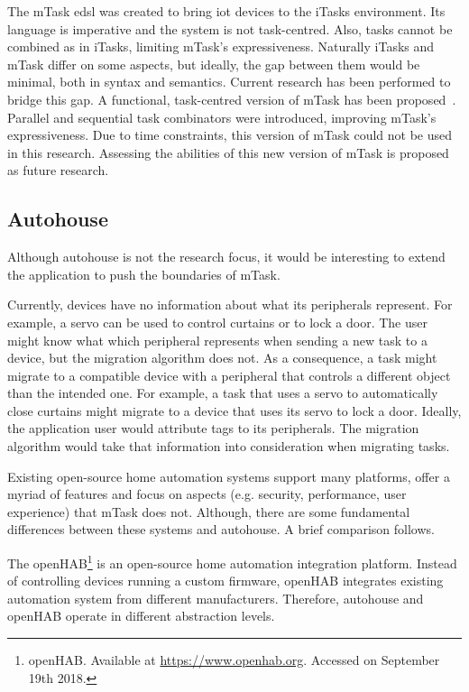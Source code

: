 The \gls{mTask} \acs{edsl} was created to bring \acs{iot} devices to the \gls{iTasks} environment. Its language is imperative and the system is not task-centred. Also, tasks cannot be combined as in \gls{iTasks}, limiting \gls{mTask}'s expressiveness. Naturally \gls{iTasks} and \gls{mTask} differ on some aspects, but ideally, the gap between them would be minimal, both in syntax and semantics. Current research has been performed to bridge this gap. A functional, task-centred version of \gls{mTask} has been proposed~\cite{micro}. Parallel and sequential task combinators were introduced, improving \gls{mTask}'s expressiveness. Due to time constraints, this version of \gls{mTask} could not be used in this research. Assessing the abilities of this new version of \gls{mTask} is proposed as future research.

\subsection{Autohouse}

Although \gls{autohouse} is not the research focus, it would be interesting to extend the application to push the boundaries of \gls{mTask}. 

Currently, devices have no information about what its peripherals represent. For example, a servo can be used to control curtains or to lock a door. The user might know what which peripheral represents when sending a new task to a device, but the migration algorithm does not. As a consequence, a task might migrate to a compatible device with a peripheral that controls a different object than the intended one. For example, a task that uses a servo to automatically close curtains might migrate to a device that uses its servo to lock a door. Ideally, the application user would attribute tags to its peripherals. The migration algorithm would take that information into consideration when migrating tasks.

Existing open-source home automation systems support many platforms, offer a myriad of features and focus on aspects (e.g. security, performance, user experience) that \gls{mTask} does not. Although, there are some fundamental differences between these systems and \gls{autohouse}. A brief comparison follows.

The openHAB\footnote{openHAB. Available at \url{https://www.openhab.org}. Accessed on September 19th 2018.} is an open-source home automation integration platform. Instead of controlling devices running a custom firmware, openHAB integrates existing automation system from different manufacturers. Therefore, \gls{autohouse} and openHAB operate in different abstraction levels.

